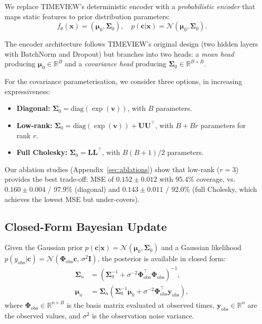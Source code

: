 \documentclass[final]{article}
\begin{document}
We replace TIMEVIEW's deterministic encoder with a \emph{probabilistic encoder} that maps static features to prior distribution parameters:
\begin{equation}
    f_\theta(\mathbf{x}) = (\boldsymbol{\mu}_0, \boldsymbol{\Sigma}_0), \quad p(\mathbf{c} | \mathbf{x}) = \mathcal{N}(\boldsymbol{\mu}_0, \boldsymbol{\Sigma}_0).
    \label{eq:prior}
\end{equation}

The encoder architecture follows TIMEVIEW's original design (two hidden layers with BatchNorm and Dropout) but branches into two heads: a \emph{mean head} producing $\boldsymbol{\mu}_0 \in \mathbb{R}^B$ and a \emph{covariance head} producing $\boldsymbol{\Sigma}_0 \in \mathbb{R}^{B \times B}$.

For the covariance parameterisation, we consider three options, in increasing expressiveness:
\begin{itemize}
    \item \textbf{Diagonal:} $\boldsymbol{\Sigma}_0 = \mathrm{diag}(\exp(\mathbf{v}))$, with $B$ parameters.
    \item \textbf{Low-rank:} $\boldsymbol{\Sigma}_0 = \mathrm{diag}(\exp(\mathbf{v})) + \mathbf{U}\mathbf{U}^\top$, with $B + Br$ parameters for rank $r$.
    \item \textbf{Full Cholesky:} $\boldsymbol{\Sigma}_0 = \mathbf{L}\mathbf{L}^\top$, with $B(B+1)/2$ parameters.
\end{itemize}
Our ablation studies (Appendix~\ref{sec:ablations}) show that low-rank ($r=3$) provides the best trade-off: MSE of $0.152 \pm 0.012$ with 95.4\% coverage, vs.\ $0.160 \pm 0.004$ / 97.9\% (diagonal) and $0.143 \pm 0.011$ / 92.0\% (full Cholesky, which achieves the lowest MSE but under-covers).

\subsection{Closed-Form Bayesian Update}
\label{sec:bayesian_update}

Given the Gaussian prior $p(\mathbf{c} | \mathbf{x}) = \mathcal{N}(\boldsymbol{\mu}_0, \boldsymbol{\Sigma}_0)$ and a Gaussian likelihood $p(y_{\mathrm{obs}} | \mathbf{c}) = \mathcal{N}(\boldsymbol{\Phi}_{\mathrm{obs}} \mathbf{c},\, \sigma^2 \mathbf{I})$, the posterior is available in closed form:
\begin{align}
    \boldsymbol{\Sigma}_n &= \left(\boldsymbol{\Sigma}_0^{-1} + \sigma^{-2} \boldsymbol{\Phi}_{\mathrm{obs}}^\top \boldsymbol{\Phi}_{\mathrm{obs}}\right)^{-1},
    \label{eq:posterior_cov} \\
    \boldsymbol{\mu}_n &= \boldsymbol{\Sigma}_n \left(\boldsymbol{\Sigma}_0^{-1} \boldsymbol{\mu}_0 + \sigma^{-2} \boldsymbol{\Phi}_{\mathrm{obs}}^\top \mathbf{y}_{\mathrm{obs}}\right),
    \label{eq:posterior_mean}
\end{align}
where $\boldsymbol{\Phi}_{\mathrm{obs}} \in \mathbb{R}^{n \times B}$ is the basis matrix evaluated at observed times, $\mathbf{y}_{\mathrm{obs}} \in \mathbb{R}^n$ are the observed values, and $\sigma^2$ is the observation noise variance.
\end{document}
